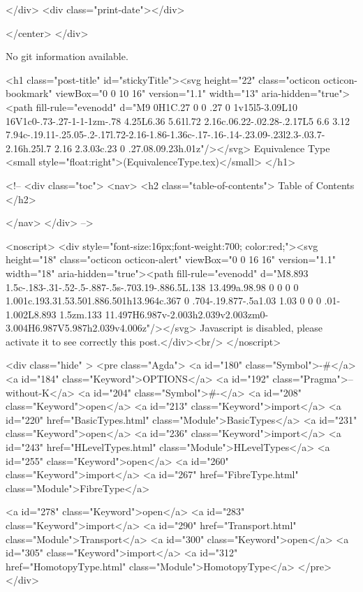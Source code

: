           
        </div>
        <div class="print-date"></div>
        
        
    </center>
  </div>

  
  No git information available.
  

  <h1 class="post-title" id="stickyTitle"><svg height="22" class="octicon octicon-bookmark" viewBox="0 0 10 16" version="1.1" width="13" aria-hidden="true"><path fill-rule="evenodd" d="M9 0H1C.27 0 0 .27 0 1v15l5-3.09L10 16V1c0-.73-.27-1-1-1zm-.78 4.25L6.36 5.61l.72 2.16c.06.22-.02.28-.2.17L5 6.6 3.12 7.94c-.19.11-.25.05-.2-.17l.72-2.16-1.86-1.36c-.17-.16-.14-.23.09-.23l2.3-.03.7-2.16h.25l.7 2.16 2.3.03c.23 0 .27.08.09.23h.01z"/></svg> Equivalence Type <small style="float:right">(EquivalenceType.tex)</small>
  </h1>

  <!-- 
  <div class="toc">
    <nav>
    <h2 class="table-of-contents"> Table of Contents </h2>
      

    </nav>
  </div>
   -->

  <noscript>
  <div style="font-size:16px;font-weight:700; color:red;"><svg height="18" class="octicon octicon-alert" viewBox="0 0 16 16" version="1.1" width="18" aria-hidden="true"><path fill-rule="evenodd" d="M8.893 1.5c-.183-.31-.52-.5-.887-.5s-.703.19-.886.5L.138 13.499a.98.98 0 0 0 0 1.001c.193.31.53.501.886.501h13.964c.367 0 .704-.19.877-.5a1.03 1.03 0 0 0 .01-1.002L8.893 1.5zm.133 11.497H6.987v-2.003h2.039v2.003zm0-3.004H6.987V5.987h2.039v4.006z"/></svg> Javascript is disabled, please activate it to see correctly this post.</div><br/>
  </noscript>

  <div class="hide" >
<pre class="Agda">
<a id="180" class="Symbol">{-#</a> <a id="184" class="Keyword">OPTIONS</a> <a id="192" class="Pragma">--without-K</a> <a id="204" class="Symbol">#-}</a>
<a id="208" class="Keyword">open</a> <a id="213" class="Keyword">import</a> <a id="220" href="BasicTypes.html" class="Module">BasicTypes</a>
<a id="231" class="Keyword">open</a> <a id="236" class="Keyword">import</a> <a id="243" href="HLevelTypes.html" class="Module">HLevelTypes</a>
<a id="255" class="Keyword">open</a> <a id="260" class="Keyword">import</a> <a id="267" href="FibreType.html" class="Module">FibreType</a>

<a id="278" class="Keyword">open</a> <a id="283" class="Keyword">import</a> <a id="290" href="Transport.html" class="Module">Transport</a>
<a id="300" class="Keyword">open</a> <a id="305" class="Keyword">import</a> <a id="312" href="HomotopyType.html" class="Module">HomotopyType</a>
</pre>
</div>

